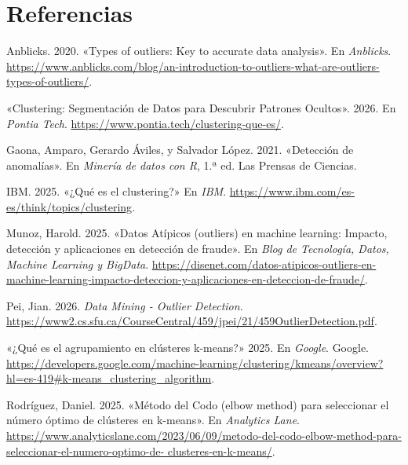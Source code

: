 \documentclass[
  spanish,
  letterpaper,
  DIV=11,
  numbers=noendperiod]{scrreprt}
\newlength{\cslhangindent}
\newenvironment{CSLReferences}[2] %
 {\begin{list}{}{%
  \setlength{\itemindent}{0pt}
  \setlength{\leftmargin}{0pt}
  \setlength{\parsep}{0pt}
  \ifodd #1
   \setlength{\leftmargin}{\cslhangindent}
   \setlength{\itemindent}{-1\cslhangindent}
  \fi
  \setlength{\itemsep}{#2\baselineskip}}}
 {\end{list}}
\begin{document}

\chapter{Referencias}\label{referencias}

\protect{}\label{refs}
\begin{CSLReferences}{1}{1}
Anblicks. 2020. {«Types of outliers: Key to accurate data analysis»}. En
\emph{Anblicks}.
\url{https://www.anblicks.com/blog/an-introduction-to-outliers-what-are-outliers-types-of-outliers/}.

{«Clustering: Segmentación de Datos para Descubrir Patrones Ocultos»}.
2026. En \emph{Pontia Tech}.
\url{https://www.pontia.tech/clustering-que-es/}.

Gaona, Amparo, Gerardo Áviles, y Salvador López. 2021. {«Detección de
anomalías»}. En \emph{Minería de datos con R}, 1.ª ed. Las Prensas de
Ciencias.

IBM. 2025. {«¿Qué es el clustering?»} En \emph{IBM}.
\url{https://www.ibm.com/es-es/think/topics/clustering}.

Munoz, Harold. 2025. {«Datos Atípicos (outliers) en machine learning:
Impacto, detección y aplicaciones en detección de fraude»}. En
\emph{Blog de Tecnología, Datos, Machine Learning y BigData}.
\url{https://disenet.com/datos-atipicos-outliers-en-machine-learning-impacto-deteccion-y-aplicaciones-en-deteccion-de-fraude/}.

Pei, Jian. 2026. \emph{Data Mining - Outlier Detection}.
\url{https://www2.cs.sfu.ca/CourseCentral/459/jpei/21/459OutlierDetection.pdf}.

{«¿Qué es el agrupamiento en clústeres k-means?»} 2025. En
\emph{Google}. Google.
\url{https://developers.google.com/machine-learning/clustering/kmeans/overview?hl=es-419\#k-means_clustering_algorithm}.

Rodríguez, Daniel. 2025. {«Método del Codo (elbow method) para
seleccionar el número óptimo de clústeres en k-means»}. En
\emph{Analytics Lane}.
\href{https://www.analyticslane.com/2023/06/09/metodo-del-codo-elbow-method-para-seleccionar-el-numero-optimo-de-\%0Aclusteres-en-k-means/}{https://www.analyticslane.com/2023/06/09/metodo-del-codo-elbow-method-para-seleccionar-el-numero-optimo-de-
clusteres-en-k-means/}.

\end{CSLReferences}
\end{document}
